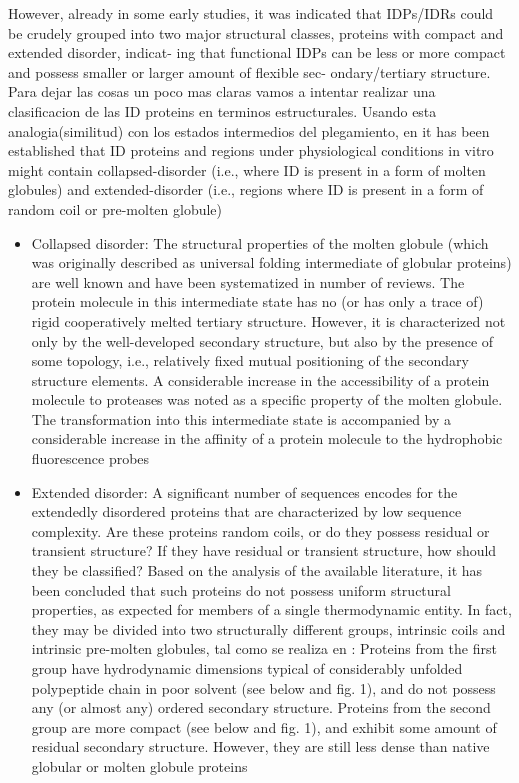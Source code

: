 However, already in some early studies, it was indicated that IDPs/IDRs could be crudely grouped into two major structural classes, proteins with compact and extended disorder, indicat-
ing that functional IDPs can be less or more compact
and possess smaller or larger amount of flexible sec-
ondary/tertiary structure.
Para dejar las cosas un poco mas claras vamos a intentar realizar una clasificacion de las ID proteins en terminos estructurales.
Usando esta analogia(similitud) con los estados intermedios del plegamiento, en \cite{uversky2010understanding} it has been established that ID proteins and regions under physiological conditions in vitro might 
contain collapsed-disorder (i.e., where ID is present in a form of molten globules) and extended-disorder (i.e., regions where ID is present in a form of random coil or pre-molten globule)

\begin{itemize}
 \item Collapsed disorder:  The structural properties of the molten globule (which was originally described as universal folding intermediate of globular proteins) are well known and
have been systematized in number of reviews. The protein molecule in this intermediate state has no (or has only a trace of) rigid cooperatively melted tertiary structure. However, it is characterized not only by the well-developed secondary structure, but also by the presence of some topology, i.e., relatively fixed mutual positioning of the secondary structure elements. A considerable increase in the accessibility of a protein molecule to proteases was noted as a specific property of the molten globule.
The transformation into this intermediate state is accompanied by a considerable increase in the affinity of a protein molecule to the hydrophobic fluorescence probes

 \item Extended disorder:  A significant number of sequences encodes for the extendedly disordered proteins that are characterized by low sequence complexity. Are these proteins
random coils, or do they possess residual or transient structure? If they have residual or transient structure, how should they be classified? Based on the analysis of the available literature, it has been concluded that such proteins do not possess uniform structural properties, as expected for members of a single thermodynamic entity.
In fact, they may be divided into two structurally different groups, intrinsic coils and intrinsic pre-molten globules, tal como se realiza en \cite{uversky2002natively}: 
 Proteins from the first group have hydrodynamic dimensions typical of considerably unfolded polypeptide chain in poor solvent (see below and fig. 1), and do not possess any (or almost any) ordered secondary structure. 
Proteins from the second group are more compact (see below and fig. 1), and exhibit some amount of residual secondary structure. However, they are still less dense than native globular or molten globule proteins
\end{itemize}



